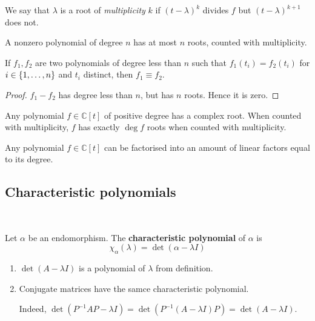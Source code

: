 \documentclass[a4paper]{article}
\begin{document}
\begin{remark}
	We say that $ \lambda $ is a root of \textit{multiplicity} $ k $ if $ (t-\lambda)^k $ divides $ f $ but $ (t-\lambda)^{k+1} $ does not.
\end{remark}

\begin{corollary}
	A nonzero polynomial of degree $ n $ has at most $ n $ roots, counted with multiplicity.
\end{corollary}
\begin{corollary}
	If $ f_1, f_2 $ are two polynomials of degree less than $ n $ such that $ f_1(t_i) = f_2(t_i) $ for $ i \in \qty{1, \dots, n} $ and $ t_i $ distinct, then $ f_1 \equiv f_2 $.
\end{corollary}
\begin{proof}
	$ f_1 - f_2 $ has degree less than $ n $, but has $ n $ roots.
	Hence it is zero.
\end{proof}

\begin{theorem}
	Any polynomial $ f \in \mathbb C[t] $ of positive degree has a complex root.
	When counted with multiplicity, $ f $ has exactly $ \deg f $ roots when counted with multiplicity. 
\end{theorem}
\begin{corollary}
	Any polynomial $ f \in \mathbb C[t] $ can be factorised into an amount of linear factors equal to its degree.
\end{corollary}

\subsection{Characteristic polynomials}\ \vspace{-1.5em}
\begin{definition}
	Let $ \alpha $ be an endomorphism.
	The \textbf{characteristic polynomial} of $ \alpha $ is
	\[
		\chi_\alpha(\lambda) = \det(\alpha - \lambda I)
	\]
\end{definition}

\begin{remark}
	\begin{enumerate}
		\item $ \det (A-\lambda I) $ is a polynomial of $\lambda$ from definition. 
		\item Conjugate matrices have the samce characteristic polynomial. 
		
		Indeed, $ \det( P^{-1}AP - \lambda I) = \det ( P^{-1}(A-\lambda I)P) = \det(A - \lambda I) $.
	\end{enumerate}
\end{remark}
\end{document}
